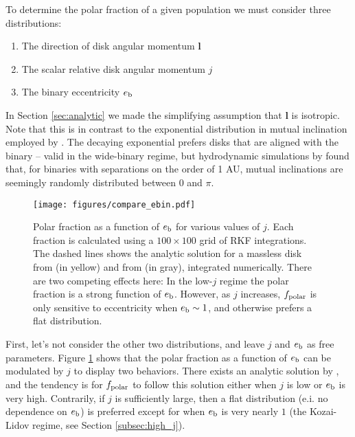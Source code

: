 \documentclass[twocolumn]{aastex631}
\begin{document}
To determine the polar fraction of a given population we must consider three distributions:
\begin{enumerate}
    \item The direction of disk angular momentum $\bm{l}$ \label{it:l} \\
    \item The scalar relative disk angular momentum $j$ \label{it:j} \\
    \item The binary eccentricity $e_{\rm b}$ \label{it:eb}
\end{enumerate}

In Section \ref{sec:analytic} we made the simplifying assumption that $\bm{l}$ is isotropic. Note that this is in contrast to the exponential distribution in
mutual inclination employed by \citet{ceppi2024}. The decaying exponential prefers disks that are aligned with the binary -- valid in the wide-binary regime, but
hydrodynamic simulations by \citet{elsender2023} found that, for binaries with separations on the order of 1 AU, mutual inclinations are seemingly randomly
distributed between $0$ and $\pi$. %

\begin{figure*}[!htbp]
    \begin{centering}
        \texttt{[image: figures/compare\_ebin.pdf]}
        \caption{
            Polar fraction as a function of $e_{\rm b}$ for various values of $j$. Each fraction is calculated using a $100\times 100$ grid of RKF integrations.
            The dashed lines shows the analytic solution for a massless disk from \citet{zanazzi2018} (in yellow) and from \citet{martin2019} (in gray), integrated numerically.
            There are two competing effects here:
            In the low-$j$ regime the polar fraction is a strong function of $e_{\rm b}$. However, as $j$ increases, $f_{\rm polar}$ is only sensitive to eccentricity
            when $e_{\rm b} \sim 1$, and otherwise prefers a flat distribution.
        }
        \label{fig:ebin}
    \end{centering}
\end{figure*}

First, let's not consider the other two distributions, and leave $j$ and $e_{\rm b}$ as free parameters. Figure \ref{fig:ebin} shows that the polar fraction
as a function of $e_{\rm b}$ can be modulated by $j$ to display two behaviors. There exists an analytic solution by \citet{zanazzi2018}, and the tendency is
for $f_{\rm polar}$ to follow this solution either when $j$ is low or $e_{\rm b}$ is very high. Contrarily, if $j$ is sufficiently large, then a flat distribution
(e.i. no dependence on $e_{\rm b}$) is preferred except for when $e_{\rm b}$ is very nearly $1$ (the Kozai-Lidov regime, see Section \ref{subsec:high_j}).
\end{document}
